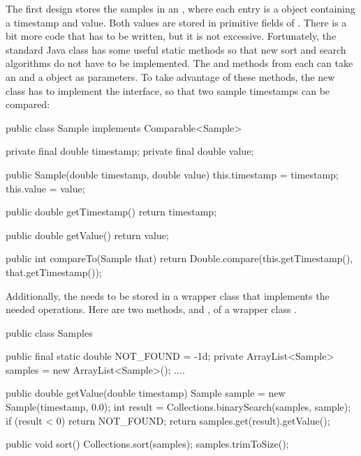 The first design stores the samples in an , where each entry
is a  object containing a timestamp and value. Both values are
stored in primitive  fields of .  There is a bit
more code that has to be written, but it is not excessive. Fortunately, the
standard Java  class has some useful static methods so that
new sort and search algorithms do not have to be implemented. The 
and  methods from  each can take an
 and a  object as parameters. To take
advantage of these methods, the new  class has to implement the
 interface, so that two sample timestamps can be compared:

\begin{shortlisting}
   
    public class Sample implements Comparable<Sample> {

        private final double timestamp;
        private final double value;
	
        public Sample(double timestamp, double value) {
            this.timestamp = timestamp;
            this.value = value;
        }
	
        public double getTimestamp() {
            return timestamp;
        }
	
        public double getValue() {
            return value;
        }
	      
        public int compareTo(Sample that) {
            return Double.compare(this.getTimestamp(), that.getTimestamp());	
        }
    }

\end{shortlisting}

Additionally, the  needs to be stored in a wrapper class that
implements the needed operations. Here are two methods,  and
, of a wrapper class .

\begin{shortlisting}
    public class Samples {
    
    	public final static double NOT_FOUND = -1d;
        private ArrayList<Sample> samples = new ArrayList<Sample>();
        ....
		
        public double getValue(double timestamp) {
            Sample sample = new Sample(timestamp, 0.0);
            int result = Collections.binarySearch(samples, sample);
            if (result < 0) {
                return NOT_FOUND;
            }
            return samples.get(result).getValue();
        }
		
        public void sort() {
            Collections.sort(samples);
            samples.trimToSize();	
        }
    }
    
\end{shortlisting}
  
